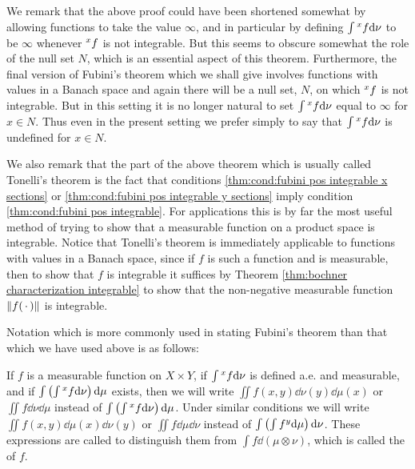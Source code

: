 We remark that the above proof could have been shortened somewhat by allowing functions to take the value $\infty$, and in particular by defining $\int\xsec{f}{x}\dd\nu$ to be $\infty$ whenever $\xsec{f}{x}$ is not integrable. But this seems to obscure somewhat the role of the null set $N$, which is an essential aspect of this theorem. Furthermore, the final version of Fubini's theorem which we shall give involves functions with values in a Banach space and again there will be a null set, $N$, on which $\xsec{f}{x}$ is not integrable. But in this setting it is no longer natural to set $\int\xsec{f}{x}\dd\nu$ equal to $\infty$ for $x\in N$. Thus even in the present setting we prefer simply to say that $\int\xsec{f}{x}\dd\nu$ is undefined for $x\in N$.

We also remark that the part of the above theorem which is usually called Tonelli's theorem is the fact that conditions \ref{thm:cond:fubini pos integrable x sections} or \ref{thm:cond:fubini pos integrable y sections} imply condition \ref{thm:cond:fubini pos integrable}. For applications this is by far the most useful method of trying to show that a measurable function on a product space is integrable. Notice that Tonelli's theorem is immediately applicable to functions with values in a Banach space, since if $f$ is such a function and is measurable, then to show that $f$ is integrable it suffices by Theorem \ref{thm:bochner characterization integrable} to show that the non-negative measurable function $\norm{f(\imarg)}$ is integrable. %

Notation which is more commonly used in stating Fubini's theorem than that which we have used above is as follows:

\begin{definition}
If $f$ is a measurable function on $X\times Y$, if $\int\xsec{f}{x}\dd\nu$ is defined a.e. and measurable, and if $\int\br{\int\xsec{f}{x}\dd\nu}\dd\mu$ exists, then we will write $\iint f(x,y)\dd\nu(y)\dd\mu(x)$ or $\iint f\dd\nu\dd\mu$ instead of $\int\br{\int\xsec{f}{x}\dd\nu}\dd\mu$. Under similar conditions we will write $\iint f(x,y)\dd\mu(x)\dd\nu(y)$ or $\iint f\dd\mu\dd\nu$ instead of $\int\br{\int\ysec{f}{y}\dd\mu}\dd\nu$. These expressions are called  to distinguish them from $\int f\dd(\mu\otimes\nu)$, which is called the  of $f$.
\end{definition}


